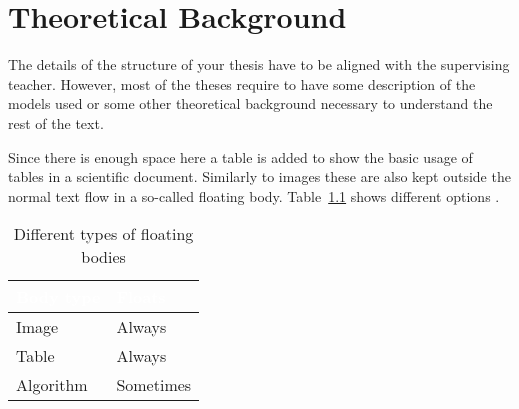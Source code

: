 \chapter{Theoretical Background}\label{cha:theoretical-background}
The details of the structure of your thesis have to be aligned with the supervising teacher. However, most of the theses require to have some description of the models used or some other theoretical background necessary to understand the rest of the text.

Since there is enough space here a table is added to show the basic usage of tables in a scientific document. Similarly to images these are also kept outside the normal text flow in a so-called floating body. Table~\ref{tab:types-of-floating-bodies} shows different options \cite{khason_computer_2008, krasner_description_1988}.

\begin{table}
	\begin{center}
	\begin{tabular}{|l|l|}
		\hline
		\cellcolor{Gray}\textcolor{White}{Body type} & \cellcolor{Gray}\textcolor{White}{Floats} \\
		\hline
		Image & Always \\
		\hline
		Table & Always \\
		\hline
		Algorithm & Sometimes \\
		\hline
	\end{tabular}
	\end{center}
	\caption{Different types of floating bodies}
	\label{tab:types-of-floating-bodies}
\end{table}